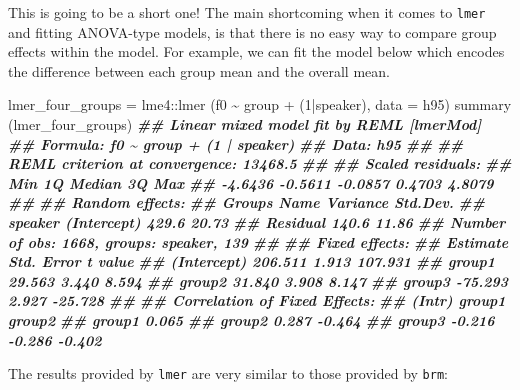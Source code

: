 \documentclass[
]{book}
\newenvironment{Shaded}{\begin{snugshade}}{\end{snugshade}}
\newcommand{\AttributeTok}[1]{\textcolor[rgb]{0.77,0.63,0.00}{#1}}
\newcommand{\DecValTok}[1]{\textcolor[rgb]{0.00,0.00,0.81}{#1}}
\newcommand{\DocumentationTok}[1]{\textcolor[rgb]{0.56,0.35,0.01}{\textbf{\textit{#1}}}}
\newcommand{\FunctionTok}[1]{\textcolor[rgb]{0.00,0.00,0.00}{#1}}
\newcommand{\NormalTok}[1]{#1}
\newcommand{\OtherTok}[1]{\textcolor[rgb]{0.56,0.35,0.01}{#1}}
\newcommand{\SpecialCharTok}[1]{\textcolor[rgb]{0.00,0.00,0.00}{#1}}
\begin{document}
This is going to be a short one! The main shortcoming when it comes to \texttt{lmer} and fitting ANOVA-type models, is that there is no easy way to compare group effects within the model. For example, we can fit the model below which encodes the difference between each group mean and the overall mean.

\begin{Shaded}
\begin{Highlighting}[]
\NormalTok{lmer\_four\_groups }\OtherTok{=}\NormalTok{ lme4}\SpecialCharTok{::}\FunctionTok{lmer}\NormalTok{ (f0 }\SpecialCharTok{\textasciitilde{}}\NormalTok{ group }\SpecialCharTok{+}\NormalTok{ (}\DecValTok{1}\SpecialCharTok{|}\NormalTok{speaker), }\AttributeTok{data =}\NormalTok{ h95)}
\FunctionTok{summary}\NormalTok{ (lmer\_four\_groups)}
\DocumentationTok{\#\# Linear mixed model fit by REML [\textquotesingle{}lmerMod\textquotesingle{}]}
\DocumentationTok{\#\# Formula: f0 \textasciitilde{} group + (1 | speaker)}
\DocumentationTok{\#\#    Data: h95}
\DocumentationTok{\#\# }
\DocumentationTok{\#\# REML criterion at convergence: 13468.5}
\DocumentationTok{\#\# }
\DocumentationTok{\#\# Scaled residuals: }
\DocumentationTok{\#\#     Min      1Q  Median      3Q     Max }
\DocumentationTok{\#\# {-}4.6436 {-}0.5611 {-}0.0857  0.4703  4.8079 }
\DocumentationTok{\#\# }
\DocumentationTok{\#\# Random effects:}
\DocumentationTok{\#\#  Groups   Name        Variance Std.Dev.}
\DocumentationTok{\#\#  speaker  (Intercept) 429.6    20.73   }
\DocumentationTok{\#\#  Residual             140.6    11.86   }
\DocumentationTok{\#\# Number of obs: 1668, groups:  speaker, 139}
\DocumentationTok{\#\# }
\DocumentationTok{\#\# Fixed effects:}
\DocumentationTok{\#\#             Estimate Std. Error t value}
\DocumentationTok{\#\# (Intercept)  206.511      1.913 107.931}
\DocumentationTok{\#\# group1        29.563      3.440   8.594}
\DocumentationTok{\#\# group2        31.840      3.908   8.147}
\DocumentationTok{\#\# group3       {-}75.293      2.927 {-}25.728}
\DocumentationTok{\#\# }
\DocumentationTok{\#\# Correlation of Fixed Effects:}
\DocumentationTok{\#\#        (Intr) group1 group2}
\DocumentationTok{\#\# group1  0.065              }
\DocumentationTok{\#\# group2  0.287 {-}0.464       }
\DocumentationTok{\#\# group3 {-}0.216 {-}0.286 {-}0.402}
\end{Highlighting}
\end{Shaded}

The results provided by \texttt{lmer} are very similar to those provided by \texttt{brm}:
\end{document}
